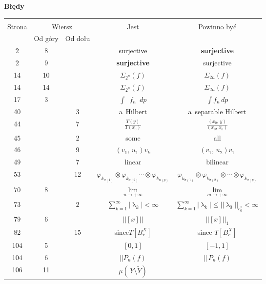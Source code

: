 \documentclass[a4paper,11pt]{article}
\newcommand{\fr}{\frac}
\newcommand{\wt}{\widetilde}
\newcommand{\ra}{\rightarrow}
\newcommand{\la}{\uplambda}
\newcommand{\vp}{\varphi}
\newcommand{\si}{\sigma}
\newcommand{\Si}{\Sigma}
\newcommand{\setm}{\setminus}
\newcommand{\ot}{\otimes}
\newcommand{\Lim}{\lim\limits}
\newcommand{\Sum}{\sum\limits}
\newcommand{\Int}{\int\limits}
\newcommand{\IntCaD}[2] { \Int #1 \, d#2 } %
\providecommand{\absj}[1]{\lvert #1 \rvert}
\providecommand{\absd}[1]{\left| #1 \right|}
\providecommand{\absd}[1]{\left| \, #1 \, \right|}
\newcommand{\norm}[1]{\left|\left| #1 \right|\right|}
\newcommand{\tb}{\textbf}
\newcommand{\Center}[1]{\begin{center} #1 \end{center}}
\newcommand{\CenterTB}[1]{\Center{\tb{#1}}}
\newcommand{\SP}[2]{( #1, \, #2 )} %
\begin{document}
\newpage



\CenterTB{Błędy}
\begin{center}
  \begin{tabular}{|c|c|c|c|c|}
    \hline
    & \multicolumn{2}{c|}{} & & \\
    Strona & \multicolumn{2}{c|}{Wiersz}& Jest & Powinno być \\ \cline{2-3}
    & Od góry & Od dołu &  &  \\ \hline
    2 & 8 & & surjective & \tb{surjective} \\
    2 & 9 & & \tb{surjective} & surjective \\
    14 & 10 & & $\Si_{ 2^{ n } }( f )$ & $\Si_{ 2 n }( f )$ \\
    14 & 14 & & $\Si_{ 2^{ n } }( f )$ & $\Si_{ 2 n }( f )$ \\
    17 & 3 & & $\int \;\: f_{ n } \;\: dp$ & $\IntCaD{ f_{ n } }{ p }$ \\
    40 & & 3 & a~Hilbert & a~separable Hilbert \\
    44 & & 7 & $\fr{ T( y ) }{ T( x_{ 0 } ) }$
           & $\fr{ \SP{ x_{ 0 } }{ y } }{ \SP{ x_{ 0 } }{ x_{ 0 } } }$ \\
    45 & & 2 & some & all \\
    46 & & 9 & $\SP{ v_{ 1 } }{ u_{ 1 } } v_{ k }$
           & $\SP{ v_{ 1 } }{ u_{ 2 } } v_{ 1 }$ \\
    49 & & 7 & linear & bilinear \\
    53 & & 12 & $\vp_{ k_{ \si( 1 ) } } \ot \vp_{ k_{ \si( 2 ) } } \cdots
                \ot \vp_{ k_{ n( p ) } }$
           & $\vp_{ k_{ \si( 1 ) } } \ot \vp_{ k_{ \si( 2 ) } } \ot \cdots
             \ot \vp_{ k_{ \si( p ) } }$ \\
    70 & 8 & & $\Lim_{ n \ra +\infty }$ & $\Lim_{ m \ra +\infty }$ \\ %
    73 & & 2 & $\Sum_{ k = 1 }^{ \infty } \absd{ \la_{ k } } < \infty$
           & $\Sum_{ k = 1 }^{ \infty } \absj{ \la_{ k } } \leq
             \norm{ \la_{ 0 } }_{ c_{ 0 }^{ * } } < \infty$ \\
    79 & 6 & & $\norm{ [x] }$ & $\norm{ [x] }_{ 1 }$ \\
    82 & & 15 & since$T[ B_{ r }^{ X } ]$ & since $T[ B_{ r }^{ X } ]$ \\
    104 & 5 & & $[ 0, 1 ]$ & $[ -1, 1 ]$ \\
    104 & 6 & & $||P_{ n }( f )$ & $|| \, P_{ n }( f )$ \\
    106 & 11 & & $\mu( \, Y \setm \wt{ Y } )$

\end{tabular}
\end{center}
\end{document}
